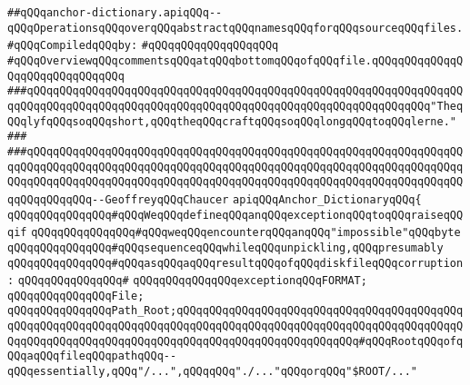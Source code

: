 \label{src/app/makelib/paths/anchor-dictionary.api}
\verb|##qQQqanchor-dictionary.apiqQQq--qQQqOperationsqQQqoverqQQqabstractqQQqnamesqQQqforqQQqsourceqQQqfiles.|\newline
\newline
\verb|#qQQqCompiledqQQqby:|\newline
\verb|#qQQqqQQqqQQqqQQqqQQq|\newline
\newline
\verb|#qQQqOverviewqQQqcommentsqQQqatqQQqbottomqQQqofqQQqfile.qQQqqQQqqQQqqQQqqQQqqQQqqQQqqQQq|\newline
\newline
\newline
\newline
\verb|###qQQqqQQqqQQqqQQqqQQqqQQqqQQqqQQqqQQqqQQqqQQqqQQqqQQqqQQqqQQqqQQqqQQqqQQqqQQqqQQqqQQqqQQqqQQqqQQqqQQqqQQqqQQqqQQqqQQqqQQqqQQqqQQqqQQq"TheqQQqlyfqQQqsoqQQqshort,qQQqtheqQQqcraftqQQqsoqQQqlongqQQqtoqQQqlerne."|\newline
\verb|###|\newline
\verb|###qQQqqQQqqQQqqQQqqQQqqQQqqQQqqQQqqQQqqQQqqQQqqQQqqQQqqQQqqQQqqQQqqQQqqQQqqQQqqQQqqQQqqQQqqQQqqQQqqQQqqQQqqQQqqQQqqQQqqQQqqQQqqQQqqQQqqQQqqQQqqQQqqQQqqQQqqQQqqQQqqQQqqQQqqQQqqQQqqQQqqQQqqQQqqQQqqQQqqQQqqQQqqQQqqQQqqQQqqQQq--GeoffreyqQQqChaucer|\newline
\newline
\newline
\newline
\verb|apiqQQqAnchor_DictionaryqQQq{|\newline
\newline
\verb|qQQqqQQqqQQqqQQq#qQQqWeqQQqdefineqQQqanqQQqexceptionqQQqtoqQQqraiseqQQqif|\newline
\verb|qQQqqQQqqQQqqQQq#qQQqweqQQqencounterqQQqanqQQq"impossible"qQQqbyte|\newline
\verb|qQQqqQQqqQQqqQQq#qQQqsequenceqQQqwhileqQQqunpickling,qQQqpresumably|\newline
\verb|qQQqqQQqqQQqqQQq#qQQqasqQQqaqQQqresultqQQqofqQQqdiskfileqQQqcorruption:|\newline
\verb|qQQqqQQqqQQqqQQq#|\newline
\verb|qQQqqQQqqQQqqQQqexceptionqQQqFORMAT;|\newline
\newline
\verb|qQQqqQQqqQQqqQQqFile;|\newline
\verb|qQQqqQQqqQQqqQQqPath_Root;qQQqqQQqqQQqqQQqqQQqqQQqqQQqqQQqqQQqqQQqqQQqqQQqqQQqqQQqqQQqqQQqqQQqqQQqqQQqqQQqqQQqqQQqqQQqqQQqqQQqqQQqqQQqqQQqqQQqqQQqqQQqqQQqqQQqqQQqqQQqqQQqqQQqqQQqqQQqqQQqqQQqqQQq#qQQqRootqQQqofqQQqaqQQqfileqQQqpathqQQq--qQQqessentially,qQQq"/...",qQQqqQQq"./..."qQQqorqQQq"$ROOT/..."|\newline
